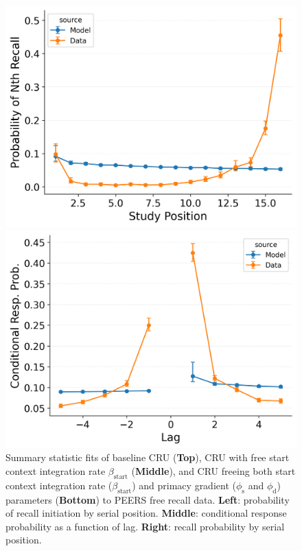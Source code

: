 \documentclass[
  man,
  floatsintext,
  longtable,
  nolmodern,
  notxfonts,
  notimes,
  draftfirst,
  colorlinks=true,linkcolor=blue,citecolor=blue,urlcolor=blue]{apa7}
\begin{document}
\begin{figure}

\caption{\label{fig-initiation}Summary statistic fits of baseline CRU
(\textbf{Top}), CRU with free start context integration rate
\(\beta_\text{start}\) (\textbf{Middle}), and CRU freeing both start
context integration rate (\(\beta_\text{start}\)) and primacy gradient
(\(\phi_\text{s}\) and \(\phi_\text{d}\)) parameters (\textbf{Bottom})
to PEERS free recall data. \textbf{Left}: probability of recall
initiation by serial position. \textbf{Middle}: conditional response
probability as a function of lag. \textbf{Right}: recall probability by
serial position.}

\begin{minipage}{0.33\linewidth}
\includegraphics{figures/HealeyKahana2014_BaseCRU_Fitting_pnr.png}\end{minipage}%
%
\begin{minipage}{0.33\linewidth}
\includegraphics{figures/HealeyKahana2014_BaseCRU_Fitting_crp.png}\end{minipage}%

\end{figure}
\end{document}

